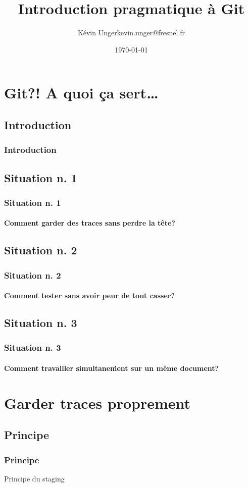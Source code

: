 \documentclass[t]{beamer}
\author{Kévin Unger\newline kevin.unger@fresnel.fr}
\date{\today}
\title{Introduction pragmatique à Git}
\begin{document}
\section{Git?! A quoi ça sert\ldots}
\subsection{Introduction}
\frame{\titlepage}
\begin{frame}[label=intro]
        \frametitle{Introduction}
\end{frame}


\subsection{Situation n. 1}
\begin{frame}[label=sit1]
        \frametitle{Situation n. 1}
        \framesubtitle{Comment garder des traces sans perdre la tête?}
\end{frame}


\subsection{Situation n. 2}
\begin{frame}[label=sit2]
        \frametitle{Situation n. 2}
        \framesubtitle{Comment tester sans avoir peur de tout casser?}
\end{frame}


\subsection{Situation n. 3}
\begin{frame}[label=sit3]
        \frametitle{Situation n. 3}
        \framesubtitle{Comment travailler simultane\'ment sur un même document?}
\end{frame}

\section{Garder traces proprement}
\subsection{Principe}
\begin{frame}
        \frametitle{Principe}
        Principe du staging
\end{frame}
\end{document}
